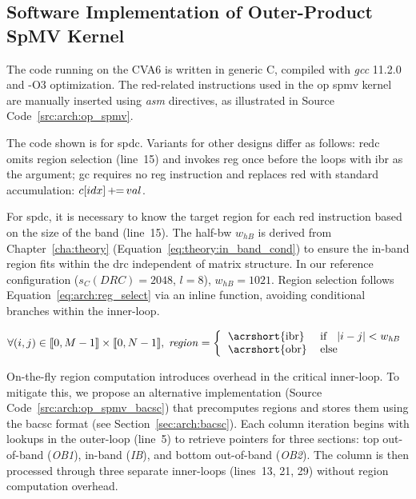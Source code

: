 \subsection{Software Implementation of Outer-Product SpMV Kernel}
\label{sec:arch:sw}

The code running on the CVA6 is written in generic C, compiled with \textit{gcc} 11.2.0 and -O3 optimization.
The \acrshort{red}-related instructions used in the \acrshort{op} \acrshort{spmv} kernel are manually inserted using \textit{asm} directives, as illustrated in Source Code~\ref{src:arch:op_spmv}.


The code shown is for \acrlong{spdc}.
Variants for other designs differ as follows: \acrshort{redc} omits region selection (line~15) and invokes \acrshort{reg} once before the loops with \acrshort{ibr} as the argument; \acrshort{gc} requires no \acrshort{reg} instruction and replaces \acrshort{red} with standard accumulation: $c[idx] \mathit{\,+\!\!=\,} val$.

For \acrlong{spdc}, it is necessary to know the target region for each \acrshort{red} instruction based on the size of the \gls{band} (line~15).
The half-\gls{bw} $w_\mathit{hB}$ is derived from Chapter~\ref{cha:theory} (Equation~\ref{eq:theory:in_band_cond}) to ensure the in-\gls{band} region fits within the \acrshort{drc} independent of matrix structure.
In our reference configuration ($s_C(\mathit{DRC}) = 2048$, $l = 8$), $w_\mathit{hB} = 1021$.
Region selection follows Equation~\ref{eq:arch:reg_select} via an inline function, avoiding conditional branches within the inner-loop.

\begin{equation}
    \label{eq:arch:reg_select}
    \forall (i,j) \in \ldb 0, M-1 \rdb \times \ldb 0, N-1 \rdb, \; \mathit{region} = \left\{
    \begin{tabular}{ll}
        \acrshort{ibr} & if \; $|i-j| < w_\mathit{hB}$ \\
        \acrshort{obr} & else
    \end{tabular} \right.
\end{equation}

On-the-fly region computation introduces overhead in the critical inner-loop.
To mitigate this, we propose an alternative implementation (Source Code~\ref{src:arch:op_spmv_bacsc}) that precomputes regions and stores them using the \acrshort{bacsc} format (see Section~\ref{sec:arch:bacsc}).
Each column iteration begins with lookups in the outer-loop (line~5) to retrieve pointers for three sections: top out-of-\gls{band} (\textit{OB1}), in-\gls{band} (\textit{IB}), and bottom out-of-\gls{band} (\textit{OB2}).
The column is then processed through three separate inner-loops (lines~13, 21, 29) without region computation overhead.

